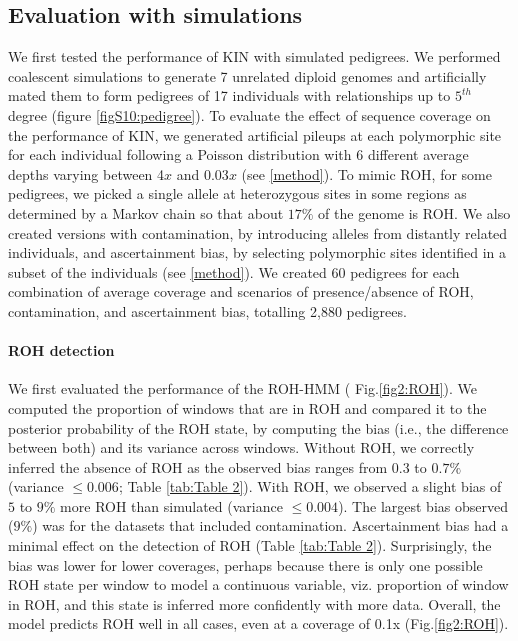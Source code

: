 \documentclass[12pt, letterpaper]{article}
\begin{document}
\subsection{Evaluation with simulations}
We first tested the performance of KIN with simulated pedigrees. We performed coalescent simulations to generate 7 unrelated diploid genomes and artificially mated them to form pedigrees of 17 individuals with relationships up to $5^{th}$ degree (figure \ref{figS10:pedigree}). To evaluate the effect of sequence coverage on the performance of KIN, we generated artificial pileups at each polymorphic site for each individual following a Poisson distribution with 6 different average depths varying between 4$x$ and 0.03$x$ (see \ref{method}). To mimic ROH, for some pedigrees, we picked a single allele at heterozygous sites in some regions as determined by a Markov chain so that about $17\%$ of the genome is ROH. We also created versions with contamination, by introducing alleles from distantly related individuals, and ascertainment bias, by selecting polymorphic sites identified in a subset of the individuals (see \ref{method}). We created 60 pedigrees for each combination of average coverage and scenarios of presence/absence of ROH, contamination, and ascertainment bias, totalling 2,880 pedigrees. 

\paragraph{ROH detection}
We first evaluated the performance of the ROH-HMM ( Fig.\ref{fig2:ROH}). We computed the proportion of windows that are in ROH and compared it to the posterior probability of the ROH state, by computing the bias (i.e., the difference between both) and its variance across windows. Without ROH, we correctly inferred the absence of ROH as the observed bias ranges from $0.3$ to $0.7\%$ (variance $\leq0.006$; Table \ref{tab:Table 2}). With ROH, we observed a slight bias of $5$ to $9\%$ more ROH than simulated (variance $\leq0.004$). The largest bias observed ($9\%$) was for the datasets that included contamination. Ascertainment bias had a minimal effect on the detection of ROH (Table \ref{tab:Table 2}). Surprisingly, the bias was lower for lower coverages, perhaps because there is only one possible ROH state per window to model a continuous variable, viz. proportion of window in ROH, and this state is inferred more confidently with more data. Overall, the model predicts ROH well in all cases, even at a coverage of 0.1x (Fig.\ref{fig2:ROH}).
\end{document}
